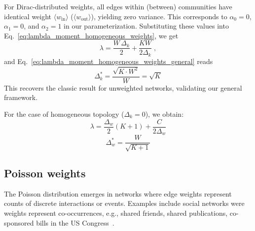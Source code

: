 \documentclass[a4paper,pre,superscriptaddress,floatfix,nofootinbib,twocolumn]{revtex4-1}
\begin{document}
For Dirac-distributed weights, all edges within (between) communities have identical weight
$\langle w_{\text{in}} \rangle$ ($\langle w_{\text{out}} \rangle$),
yielding zero variance. This corresponds to $\alpha_0 = 0$, $\alpha_1 = 0$, and $\alpha_2 = 1$ in our parameterization. Substituting these values into Eq.~\eqref{eq:lambda_moment_homogeneous_weights}, we get
\begin{equation}
\lambda =
\frac{W\, \Delta_k}{2}  + \frac{KW}{2 \Delta_k} \; ,
\label{eq:lambda_dirac}
\end{equation}
and Eq.~\eqref{eq:lambda_moment_homogeneous_weights_general} reads
\begin{equation}
\Delta_k^* = \frac{\sqrt{K \cdot W^2}}{W} = \sqrt{K}
\label{eq:dirac_det}
\end{equation}
This recovers the classic result for unweighted networks, validating our general framework.

For the case of homogeneous topology ($\Delta_{k} = 0$), we obtain:
\begin{equation}
\lambda = \frac{\Delta_{w}}{2} \left(K + 1 \right) + \frac{C}{2 \Delta_{w}}
\label{eq:lambda_dirac_w}
\end{equation}
\begin{equation}
\Delta_{w}^* = \frac{W}{\sqrt{K+1}}
\label{eq:dirac_w_det}
\end{equation}

\subsection*{Poisson weights}

The Poisson distribution emerges in networks where edge weights represent counts of discrete interactions or events. Examples include social networks were weights
represent co-occurrences, e.g., shared friends, shared publications, co-sponsored bills in the US Congress~\cite{liebig2016fast,saracco2017inferring}.
\end{document}
